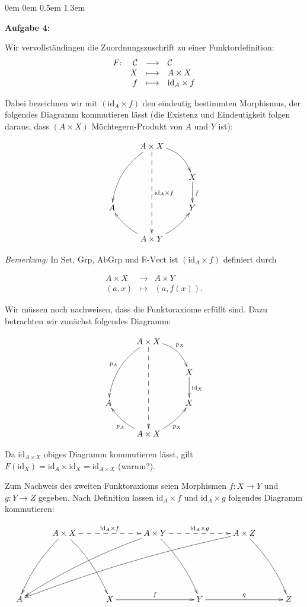 \documentclass[a4paper,ngerman]{scrartcl}
\theoremstyle{definition}
\theoremstyle{plain}
\theoremstyle{remark}
\newcommand{\C}{\mathcal{C}}
\newcommand{\Set}{\mathrm{Set}}
\newcommand{\id}{\mathrm{id}}
\newcommand{\Grp}{\mathrm{Grp}}
\newcommand{\AbGrp}{\mathrm{AbGrp}}
\begin{document}
\begin{list}{}{0em \leftmargin0em \itemindent0.5em \itemsep 1.3em}
\item[\textbf{Aufgabe 4:}]\mbox{}


Wir vervollständingen die Zuordnungszuschrift zu einer Funktordefinition:
\[ \begin{array}{@{}rrcl@{}}
  F{:} & \C &\longrightarrow& \C \\
  & X &\longmapsto& A \times X\\
  & f &\longmapsto& \id_A \times f
\end{array} \]

Dabei bezeichnen wir mit $(\id_A \times f)$ den eindeutig bestimmten Morphismus, der folgendes Diagramm kommutieren lässt (die Existenz und Eindeutigkeit folgen daraus, dass $(A \times X)$ Möchtegern-Produkt von $A$ und $Y$ ist):

\[ \xymatrix{
  & A \times X \ar@/_1pc/[ddl] \ar@/^1pc/[dr] \ar@{-->}[ddd]^{\id_A \times f}\\
  && X \ar[d]^f\\
  A && Y\\
  & A \times Y \ar@/^/[ul] \ar@/_/[ur]
} \]

\emph{Bemerkung:} In $\Set$, $\Grp$, $\AbGrp$ und $\mathrm{\mathbb{R}\text{-}Vect}$ ist $(\id_A \times f)$ definiert durch

\[ \begin{array}{ rcl }
  A \times X &\longrightarrow& A \times Y\\
  (a, x)     &\longmapsto&     (a, f(x)).
\end{array} \]

Wir müssen noch nachweisen, dass die Funktoraxiome erfüllt sind. Dazu betrachten wir zunächst folgendes Diagramm:

\[ \xymatrix{
  & A \times X \ar@/_1pc/[ddl]_{p_A} \ar@/^1pc/[dr]^{p_X} \ar@{-->}[ddd]\\
  && X \ar[d]^{\id_X}\\
  A && X\\
  & A \times X \ar@/^/[ul]^{p_A} \ar@/_/[ur]_{p_X}
} \]

Da $\id_{A \times X}$ obiges Diagramm kommutieren lässt, gilt $F(\id_X) = \id_A \times \id_X = \id_{A \times X}$ (warum?).

Zum Nachweis des zweiten Funktoraxioms seien Morphismen $f:X \to Y$ und $g:Y \to Z$ gegeben. Nach Definition lassen $\id_A \times f$ und $\id_A \times g$ folgendes Diagramm kommutieren:

\[ \xymatrix@=7ex{
  & A \times X \ar@/_/[ldd] \ar@/^/[rdd] \ar@{-->}[rr]^{\id_A \times f} && A \times Y \ar@/_/[llldd] \ar@/^/[rdd] \ar@{-->}[rr]^{\id_A \times g} && A \times Z \ar@/^/[rdd] \ar@/_/[llllldd]\\
  \\
  A && X \ar[rr]^{f} && Y \ar[rr]^{g} && Z
} \]


\end{list}
\end{document}
